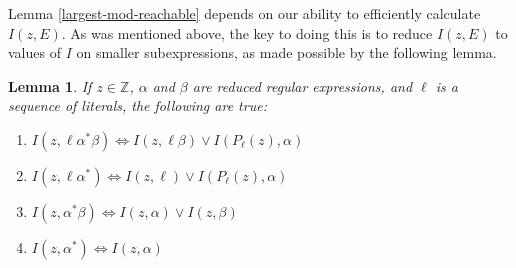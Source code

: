 \documentclass[11pt]{amsart}
\newcommand{\Z}{\mathbb{Z}}
\newtheorem{lemma}{Lemma}
\theoremstyle{definition}
\theoremstyle{remark}
\begin{document}
Lemma \ref{largest-mod-reachable} depends on our ability to efficiently calculate $I(z,E)$. As was mentioned above, the key to doing this is to reduce $I(z,E)$ to values of $I$ on smaller subexpressions, as made possible by the following lemma.

\begin{lemma} \label{I-lemma}
If $z \in \Z$, $\alpha$ and $\beta$ are reduced regular expressions, and $\ell$ is a sequence of literals, the following are true:
\begin{enumerate}
\item $I(z, \ell \alpha^* \beta) \iff I(z, \ell \beta) \lor I(P_\ell(z), \alpha)$ \label{I-lemma-literal-star-prefix}
\item $I(z, \ell \alpha^*) \iff I(z, \ell) \lor I(P_\ell(z), \alpha)$ \label{I-lemma-literal-star}
\item $I(z, \alpha^* \beta) \iff I(z, \alpha) \lor I(z, \beta)$ \label{I-lemma-star-prefix}
\item $I(z, \alpha^*) \iff I(z,\alpha)$ \label{I-lemma-star}
\end{enumerate}
\end{lemma}
\end{document}
